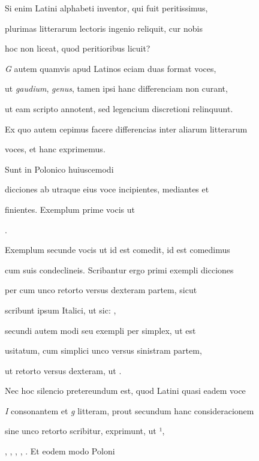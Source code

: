 Si enim Latini alphabeti inventor, qui fuit peritissimus, 

plurimas  litterarum lectoris ingenio reliquit, cur nobis 

hoc non liceat, quod peritioribus licuit? 

\indentK \textit{G} autem quamvis apud Latinos eciam duas format voces, 

ut \textit{gaudium}, \textit{genus}, tamen ipsi hanc differenciam non curant, 

ut eam scripto annotent, sed legencium discretioni relinquunt. 

Ex quo autem cepimus facere differencias inter aliarum litterarum 

\splitlines

voces, et hanc exprimemus.

\indentK Sunt in Polonico huiuscemodi 

\fulllines

dicciones ab utraque eius voce incipientes, mediantes et

finientes. Exemplum prime vocis ut   

      .

Exemplum secunde vocis ut  id est comedit,  id est comedimus

cum suis condeclineis. Scribantur ergo primi exempli dicciones

per  cum unco retorto versus dexteram partem, sicut 

scribunt ipsum Italici, ut sic:   ,

secundi autem modi seu exempli per  simplex, ut est

usitatum, cum simplici unco versus sinistram partem,

ut retorto versus dexteram, ut   .

\indentK Nec hoc silencio pretereundum est, quod Latini quasi eadem voce

\textit{I} consonantem et \textit{g} litteram, prout secundum hanc consideracionem 

sine unco retorto scribitur, exprimunt, ut ¹,

, , , , . Et eodem modo Poloni

